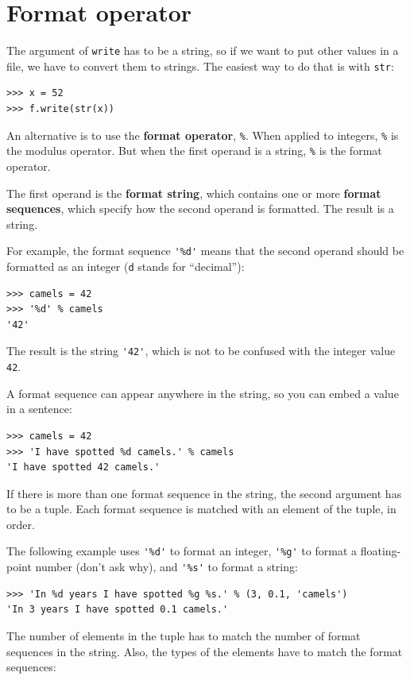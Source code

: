\documentclass[10pt]{book}
\begin{document}
\section{Format operator}

The argument of {\tt write} has to be a string, so if we want
to put other values in a file, we have to convert them to
strings.  The easiest way to do that is with {\tt str}:

\begin{verbatim}
>>> x = 52
>>> f.write(str(x))
\end{verbatim}
%
An alternative is to use the {\bf format operator}, {\tt \%}.  When
applied to integers, {\tt \%} is the modulus operator.  But
when the first operand is a string, {\tt \%} is the format operator.

The first operand is the {\bf format string}, which contains
one or more {\bf format sequences}, which
specify how
the second operand is formatted.  The result is a string.

For example, the format sequence \verb"'%d'" means that
the second operand should be formatted as an
integer ({\tt d} stands for ``decimal''):

\begin{verbatim}
>>> camels = 42
>>> '%d' % camels
'42'
\end{verbatim}
%
The result is the string \verb"'42'", which is not to be confused
with the integer value {\tt 42}.

A format sequence can appear anywhere in the string,
so you can embed a value in a sentence:

\begin{verbatim}
>>> camels = 42
>>> 'I have spotted %d camels.' % camels
'I have spotted 42 camels.'
\end{verbatim}
%
If there is more than one format sequence in the string,
the second argument has to be a tuple.  Each format sequence is
matched with an element of the tuple, in order.

The following example uses \verb"'%d'" to format an integer,
\verb"'%g'" to format
a floating-point number (don't ask why), and \verb"'%s'" to format
a string:

\begin{verbatim}
>>> 'In %d years I have spotted %g %s.' % (3, 0.1, 'camels')
'In 3 years I have spotted 0.1 camels.'
\end{verbatim}
%
The number of elements in the tuple has to match the number
of format sequences in the string.  Also, the types of the
elements have to match the format sequences:
\end{document}
